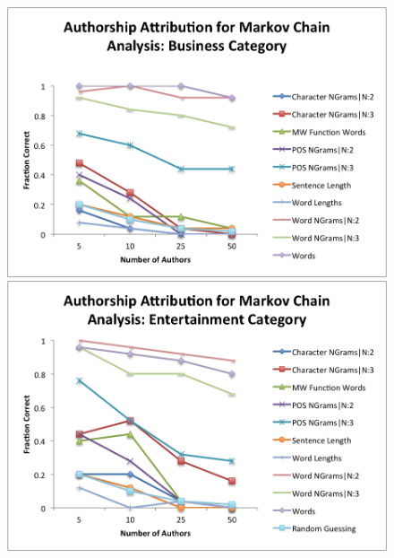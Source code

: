 \documentclass[pageno]{jpaper}
\begin{document}
\begin{figure}[h!]
\begin{center}
\includegraphics*[scale=.75]{MarkovBusiness}
\includegraphics*[scale=.75]{MarkovEntertainment}
\end{center}
\label{fig:MarkovCategories1}
\end{figure}
\end{document}
